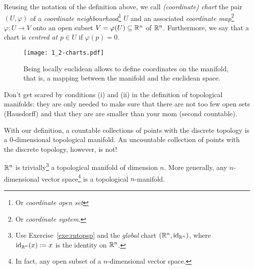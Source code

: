 \begin{notation}\label{def:coords_obj}
	Reusing the notation of the definition above, we call \emph{(coordinate) chart} the pair $(U, \varphi)$ of a \emph{coordinate neighbourhood}\footnote{Or \emph{coordinate open set}} $U$ and an associated \emph{coordinate map}\footnote{Or \emph{coordinate system}.} $\varphi: U\to V$ onto an open subset $V=\varphi(U)\subseteq\mathbb{R}^n$ of $\mathbb{R}^n$.
	Furthermore, we say that a chart is \emph{centred at $p\in U$} if $\varphi(p) = 0$.
\end{notation}

\begin{figure}[htp]
	\centering
	\texttt{[image: 1\_2-charts.pdf]}
	\caption{Being locally euclidean allows to define coordinates on the manifold, that is, a mapping between the manifold and the euclidean space.}
	\label{fig:1.2-charts}
\end{figure}

Don't get scared by conditions (i) and (ii) in the definition of topological manifolds: they are only needed to make sure that there are not too few open sets (Hausdorff) and that they are are smaller than your mom (second countable).

\begin{example}
	With our definition, a countable collections of points with the discrete topology is a $0$-dimensional topological manifold.
	An uncountable collection of points with the discrete topology, however, is not!
\end{example}

\begin{example}
	$\mathbb{R}^n$ is trivially\footnote{Use Exercise~\ref{exe:rntopsp} and the \emph{global} chart $(\mathbb{R}^n, \operatorname{id}_{\mathbb{R}^n})$, where $\operatorname{id}_{\mathbb{R}^n}(x) := x$ is the identity on $\mathbb{R}^n$.} a topological manifold of dimension $n$.
	More generally, any $n$-dimensional vector space\footnote{In fact, any open subset of a $n$-dimensional vector space.} is a topological $n$-manifold.
\end{example}

